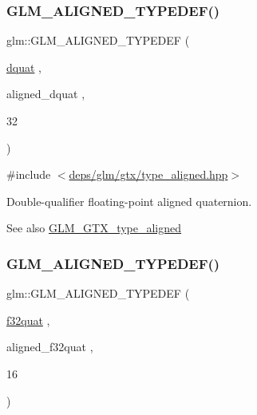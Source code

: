\subsubsection{\texorpdfstring{G\+L\+M\+\_\+\+A\+L\+I\+G\+N\+E\+D\+\_\+\+T\+Y\+P\+E\+D\+E\+F()}{GLM\_ALIGNED\_TYPEDEF()}\hspace{0.1cm}{\footnotesize\ttfamily [207/209]}}
{\footnotesize\ttfamily glm\+::\+G\+L\+M\+\_\+\+A\+L\+I\+G\+N\+E\+D\+\_\+\+T\+Y\+P\+E\+D\+EF (\begin{DoxyParamCaption}\item[{\hyperlink{fwd_8hpp_a49693161673a003b4a8fd4d8b15b0b7b}{dquat}}]{,  }\item[{aligned\+\_\+dquat}]{,  }\item[{32}]{ }\end{DoxyParamCaption})}



{\ttfamily \#include $<$\hyperlink{gtx_2type__aligned_8hpp}{deps/glm/gtx/type\+\_\+aligned.\+hpp}$>$}

Double-\/qualifier floating-\/point aligned quaternion. \begin{DoxySeeAlso}{See also}
\hyperlink{group__gtx__type__aligned}{G\+L\+M\+\_\+\+G\+T\+X\+\_\+type\+\_\+aligned} 
\end{DoxySeeAlso}
\mbox{\label{group__gtx__type__aligned_ga1ed8aeb5ca67fade269a46105f1bf273}} 
\subsubsection{\texorpdfstring{G\+L\+M\+\_\+\+A\+L\+I\+G\+N\+E\+D\+\_\+\+T\+Y\+P\+E\+D\+E\+F()}{GLM\_ALIGNED\_TYPEDEF()}\hspace{0.1cm}{\footnotesize\ttfamily [208/209]}}
{\footnotesize\ttfamily glm\+::\+G\+L\+M\+\_\+\+A\+L\+I\+G\+N\+E\+D\+\_\+\+T\+Y\+P\+E\+D\+EF (\begin{DoxyParamCaption}\item[{\hyperlink{group__gtc__type__precision_gac59c4d798396552e4bbb866b3d8a2f18}{f32quat}}]{,  }\item[{aligned\+\_\+f32quat}]{,  }\item[{16}]{ }\end{DoxyParamCaption})}



